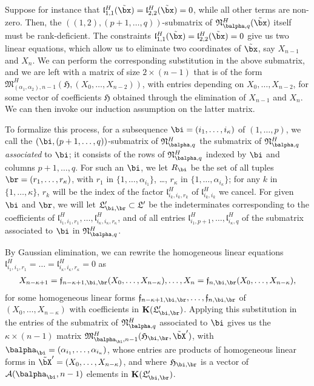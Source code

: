 \documentclass[12pt]{article}
\begin{document}
Suppose for instance that
$\mathfrak{l}^H_{1,1}(\tilde\bx)=\mathfrak{l}^H_{2,2}(\tilde\bx)=0$,
while all other terms are non-zero. Then, the
$((1,2),(p+1,\dots,q))$-submatrix of
${\mathfrak{N}^H_{\balpha,q}}(\tilde\bx)$ itself must be
rank-deficient.  The constraints
$\mathfrak{l}^H_{1,1}(\tilde\bx)=\mathfrak{l}^H_{2,2}(\tilde\bx)=0$
give us two linear equations, which allow us to eliminate two
coordinates of $\tilde\bx$, say $X_{n-1}$ and $X_n$. We can perform
the corresponding substitution in the above submatrix, and we are left
with a matrix of size $2 \times (n-1)$ that is of the form
$\mathfrak{M}^H_{(\alpha_1,\alpha_2),n-1}(\mathfrak{H},(X_0,\dots,X_{n-2}))$,
with entries depending on $X_0,\dots,X_{n-2}$, for some vector of
coefficients $\mathfrak{H}$ obtained through the elimination of
$X_{n-1}$ and $X_n$. We can then invoke our induction assumption on
the latter matrix.

To formalize this process, for a subsequence
$\bi=(i_1,\dots,i_\kappa)$ of $(1,\dots,p)$, we call the
$(\bi,(p+1,\dots,q))$-submatrix of $\mathfrak{N}^H_{\balpha,q}$ the submatrix of
$\mathfrak{N}^H_{\balpha,q}$ {\em associated} to $\bi$; it consists of the rows of
$\mathfrak{N}^H_{\balpha,q}$ indexed by $\bi$ and columns $p+1,\dots,q$.
For such an $\bi$, we let $R_\bi$ be the set of
all tuples $\br=(r_1,\dots,r_\kappa)$, with $r_1$ in
$\{1,\dots,\alpha_{i_1}\}$, \dots, $r_\kappa$ in
$\{1,\dots,\alpha_{i_\kappa}\}$; for any $k$ in $\{1,\dots,\kappa\}$,
$r_k$ will be the index of the factor $\mathfrak{l}^H_{i_k,i_k,r_k}$
of $\mathfrak{l}^H_{i_k,i_k}$ we cancel. For given $\bi$ and $\br$,
we will let $\mathfrak{L}'_{\bi,\br} \subset \mathfrak{L}'$ be the
indeterminates corresponding to the coefficients of
$\mathfrak{l}^H_{i_1,i_1,r_1},\dots,\mathfrak{l}^H_{i_\kappa,i_\kappa,r_\kappa}$, and
of all entries $\mathfrak{l}^H_{i_1,p+1},\dots,\mathfrak{l}^H_{i_\kappa,q}$
of the submatrix associated to $\bi$ in $\mathfrak{N}^H_{\balpha,q}$.

By Gaussian elimination, we can rewrite the homogeneous linear
equations
$\mathfrak{l}^H_{i_1,i_1,r_1}=\dots=\mathfrak{l}^H_{i_\kappa,i_\kappa,r_\kappa}=0$ as
\begin{align}\label{eq:f_sr}
X_{n-\kappa+1}=\mathfrak{f}_{n-\kappa+1,\bi,\br}(X_0,\dots,X_{n-\kappa}),\dots,X_{n}=\mathfrak{f}_{n,\bi,\br}(X_0,\dots,X_{n-\kappa}),  
\end{align}
for some homogeneous linear forms
$\mathfrak{f}_{n-\kappa+1,\bi,\br},\dots,\mathfrak{f}_{n,\bi,\br}$ of
$(X_0,\dots,X_{n-\kappa})$ with coefficients in
$\KK(\mathfrak{L}'_{\bi,\br})$. Applying this substitution in the
entries of the submatrix of ${\mathfrak{N}^H_{\balpha,q}}$ associated
to $\bi$ gives us the $\kappa \times (n-1)$ matrix
$\mathfrak{M}^H_{\balpha_\bi,n-1}(\mathfrak{H}_{\bi,\br},\tilde\bX')$,
with $\balpha_\bi=(\alpha_{i_1},\dots,\alpha_{i_\kappa})$, whose
entries are products of homogeneous linear forms in
$\tilde\bX'=(X_0,\dots,X_{n-\kappa})$, and where $\mathfrak{H}_{\bi,\br}$ is a
vector of ${\cal A}(\balpha_\bi,n-1)$ elements in $\KK(\mathfrak{L}'_{\bi,\br})$.
\end{document}

